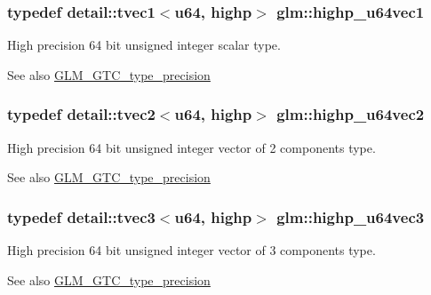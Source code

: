\subsubsection[{\texorpdfstring{highp\+\_\+u64vec1}{highp_u64vec1}}]{\setlength{\rightskip}{0pt plus 5cm}typedef detail\+::tvec1$<$u64, highp$>$ {\bf glm\+::highp\+\_\+u64vec1}}\hypertarget{group__gtc__type__precision_gab48ca217e1d1cc9aac3d9f037493ae7e}{}\label{group__gtc__type__precision_gab48ca217e1d1cc9aac3d9f037493ae7e}
High precision 64 bit unsigned integer scalar type. \begin{DoxySeeAlso}{See also}
\hyperlink{group__gtc__type__precision}{G\+L\+M\+\_\+\+G\+T\+C\+\_\+type\+\_\+precision} 
\end{DoxySeeAlso}
\subsubsection[{\texorpdfstring{highp\+\_\+u64vec2}{highp_u64vec2}}]{\setlength{\rightskip}{0pt plus 5cm}typedef detail\+::tvec2$<$u64, highp$>$ {\bf glm\+::highp\+\_\+u64vec2}}\hypertarget{group__gtc__type__precision_gad11667a4764867732a89791ec2a01aeb}{}\label{group__gtc__type__precision_gad11667a4764867732a89791ec2a01aeb}
High precision 64 bit unsigned integer vector of 2 components type. \begin{DoxySeeAlso}{See also}
\hyperlink{group__gtc__type__precision}{G\+L\+M\+\_\+\+G\+T\+C\+\_\+type\+\_\+precision} 
\end{DoxySeeAlso}
\subsubsection[{\texorpdfstring{highp\+\_\+u64vec3}{highp_u64vec3}}]{\setlength{\rightskip}{0pt plus 5cm}typedef detail\+::tvec3$<$u64, highp$>$ {\bf glm\+::highp\+\_\+u64vec3}}\hypertarget{group__gtc__type__precision_ga3cb5c038f8cba0dfb894af66b7b2ba13}{}\label{group__gtc__type__precision_ga3cb5c038f8cba0dfb894af66b7b2ba13}
High precision 64 bit unsigned integer vector of 3 components type. \begin{DoxySeeAlso}{See also}
\hyperlink{group__gtc__type__precision}{G\+L\+M\+\_\+\+G\+T\+C\+\_\+type\+\_\+precision} 
\end{DoxySeeAlso}
